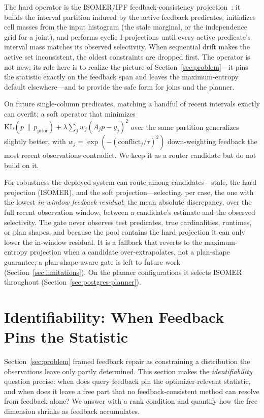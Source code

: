 \documentclass[preprint,12pt]{elsarticle}
\begin{document}
The hard operator is the ISOMER/IPF feedback-consistency
projection~\cite{markl2007consistent}: it builds the interval partition induced by the active
feedback predicates, initializes cell masses from the input histogram (the stale marginal, or
the independence grid for a joint), and performs cyclic I-projections until every active
predicate's interval mass matches its observed selectivity. When sequential drift makes the
active set inconsistent, the oldest constraints are dropped first. The operator is not new;
its role here is to realize the picture of Section~\ref{sec:problem}---it pins the statistic
exactly on the feedback span and leaves the maximum-entropy default elsewhere---and to provide
the safe form for joins and the planner.

On future single-column predicates, matching a handful of recent intervals exactly can
overfit; a soft operator that minimizes
$\mathrm{KL}(p\,\|\,p_{\text{prior}}) + \lambda \sum_j w_j (A_j p - y_j)^2$ over the same
partition generalizes slightly better, with $w_j=\exp(-(\text{conflict}_j/\tau)^2)$
down-weighting feedback the most recent observations contradict. We keep it as a router
candidate but do not build on it.

For robustness the deployed system can route among candidates---stale, the hard projection
(ISOMER), and the soft projection---selecting, per case, the one with the lowest
\emph{in-window feedback residual}: the mean absolute discrepancy, over the full recent
observation window, between a candidate's estimate and the observed selectivity. The gate
never observes test predicates, true cardinalities, runtimes, or plan shapes, and because the
pool contains the hard projection it can only lower the in-window residual. It is a fallback
that reverts to the maximum-entropy projection when a candidate over-extrapolates, not a
plan-shape guarantee; a plan-shape-aware gate is left to future work
(Section~\ref{sec:limitations}). On the planner configurations it selects ISOMER throughout
(Section~\ref{sec:postgres-planner}).

\section{Identifiability: When Feedback Pins the Statistic}
\label{sec:mechanism}

Section~\ref{sec:problem} framed feedback repair as constraining a distribution the
observations leave only partly determined. This section makes the \emph{identifiability}
question precise: when does query feedback pin the optimizer-relevant statistic, and when
does it leave a free part that no feedback-consistent method can resolve from feedback alone?
We answer with a rank condition and quantify how the free dimension shrinks as feedback
accumulates.
\end{document}
